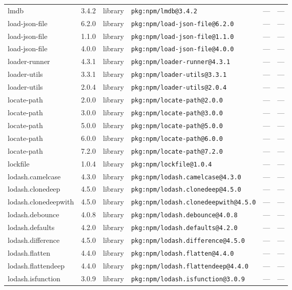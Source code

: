 \documentclass[11pt]{article}
\begin{document}
\begin{longtable}{|l|l|l|p{2.2cm}|l|p{4cm}|}
lmdb & 3.4.2 & library & \texttt{pkg:npm/lmdb@3.4.2} & — & — \\
load-json-file & 6.2.0 & library & \texttt{pkg:npm/load-json-file@6.2.0} & — & — \\
load-json-file & 1.1.0 & library & \texttt{pkg:npm/load-json-file@1.1.0} & — & — \\
load-json-file & 4.0.0 & library & \texttt{pkg:npm/load-json-file@4.0.0} & — & — \\
loader-runner & 4.3.1 & library & \texttt{pkg:npm/loader-runner@4.3.1} & — & — \\
loader-utils & 3.3.1 & library & \texttt{pkg:npm/loader-utils@3.3.1} & — & — \\
loader-utils & 2.0.4 & library & \texttt{pkg:npm/loader-utils@2.0.4} & — & — \\
locate-path & 2.0.0 & library & \texttt{pkg:npm/locate-path@2.0.0} & — & — \\
locate-path & 3.0.0 & library & \texttt{pkg:npm/locate-path@3.0.0} & — & — \\
locate-path & 5.0.0 & library & \texttt{pkg:npm/locate-path@5.0.0} & — & — \\
locate-path & 6.0.0 & library & \texttt{pkg:npm/locate-path@6.0.0} & — & — \\
locate-path & 7.2.0 & library & \texttt{pkg:npm/locate-path@7.2.0} & — & — \\
lockfile & 1.0.4 & library & \texttt{pkg:npm/lockfile@1.0.4} & — & — \\
lodash.camelcase & 4.3.0 & library & \texttt{pkg:npm/lodash.camelcase@4.3.0} & — & — \\
lodash.clonedeep & 4.5.0 & library & \texttt{pkg:npm/lodash.clonedeep@4.5.0} & — & — \\
lodash.clonedeepwith & 4.5.0 & library & \texttt{pkg:npm/lodash.clonedeepwith@4.5.0} & — & — \\
lodash.debounce & 4.0.8 & library & \texttt{pkg:npm/lodash.debounce@4.0.8} & — & — \\
lodash.defaults & 4.2.0 & library & \texttt{pkg:npm/lodash.defaults@4.2.0} & — & — \\
lodash.difference & 4.5.0 & library & \texttt{pkg:npm/lodash.difference@4.5.0} & — & — \\
lodash.flatten & 4.4.0 & library & \texttt{pkg:npm/lodash.flatten@4.4.0} & — & — \\
lodash.flattendeep & 4.4.0 & library & \texttt{pkg:npm/lodash.flattendeep@4.4.0} & — & — \\
lodash.isfunction & 3.0.9 & library & \texttt{pkg:npm/lodash.isfunction@3.0.9} & — & — \\

\end{longtable}
\end{document}
